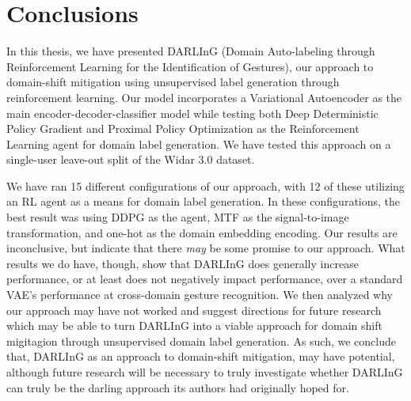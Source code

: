 \chapter{Conclusions}\label{chapter:conclusions}

In this thesis, we have presented DARLInG (Domain Auto-labeling through Reinforcement Learning for the Identification of Gestures), our approach to domain-shift mitigation using unsupervised label generation through reinforcement learning.
Our model incorporates a Variational Autoencoder as the main encoder-decoder-classifier model while testing both Deep Deterministic Policy Gradient and Proximal Policy Optimization as the Reinforcement Learning agent for domain label generation.
We have tested this approach on a single-user leave-out split of the Widar 3.0 \cite{zheng2019zero} dataset.

We have ran 15 different configurations of our approach, with 12 of these utilizing an RL agent as a means for domain label generation.
In these configurations, the best result was using DDPG as the agent, MTF as the signal-to-image transformation, and one-hot as the domain embedding encoding.
Our results are inconclusive, but indicate that there \textit{may} be some promise to our approach.
What results we do have, though, show that DARLInG does generally increase performance, or at least does not negatively impact performance, over a standard VAE's performance at cross-domain gesture recognition.
We then analyzed why our approach may have not worked and suggest directions for future research which may be able to turn DARLInG into a viable approach for domain shift migitagion through unsupervised domain label generation.
As such, we conclude that, DARLInG as an approach to domain-shift mitigation, may have potential, although future research will be necessary to truly investigate whether DARLInG can truly be the darling approach its authors had originally hoped for.